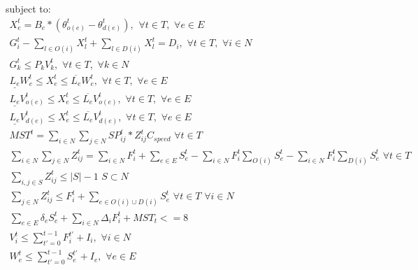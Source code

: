 \documentclass[10pt]{article}
\begin{document}
subject to:
\begin{eqnarray}
 X_e^t = B_e * (\theta_{o(e)}^t - \theta_{d(e)}^t), \hspace{5pt} \forall t \in T, \hspace{4pt} \forall e \in E\\
 G_i^t - \sum_{l \in O(i)} X_l^t + \sum_{l \in D(i)} X_l^t = D_i, \hspace{4pt} \forall t \in T, \hspace{4pt} \forall i \in N\\
 G_k^t \leq P_{k} V_{k}^t, \hspace{4pt} \forall t \in T, \hspace{4pt} \forall k \in N\\
 \underline{L_e}W_{e}^t \leq X_{e}^t \leq \overline{L_e}W_{e}^t, \hspace{4pt} \forall t \in T, \hspace{4pt} \forall e \in E\\
 \underline{L_e}V_{o(e)}^t \leq X_{e}^t \leq \overline{L_e}V_{o(e)}^t, \hspace{4pt} \forall t \in T, \hspace{4pt} \forall e \in E\\
 \underline{L_e}V_{d(e)}^t \leq X_{e}^t \leq \overline{L_e}V_{d(e)}^t, \hspace{4pt} \forall t \in T, \hspace{4pt} \forall e \in E\\
 MST^t = \sum_{i \in N} \sum_{j \in N} SP_{ij}^t*Z_{ij}^{t} C_{speed}\hspace{4pt} \forall t \in T\\
 \sum_{i \in N} \sum_{j \in N} Z_{ij}^{t} = \sum_{i \in N} F_i^t + \sum_{e \in E} S_e^t - \sum_{i \in N} F_i^t \sum_{O(i)} S_e^t - \sum_{i \in N} F_i^t \sum_{D(i)} S_e^t \hspace{4pt} \forall t \in T\\
 \sum_{i,j \in S} Z_{ij}^t \leq |S|-1 \hspace{4pt} S\subset N\\
 \sum_{j \in N} Z_{ij}^t \leq F_i^t + \sum_{e \in O(i) \cup D(i)} S_{e}^t \hspace{4pt} \forall t \in T\hspace{4pt} \forall i \in N \\
 \sum_{e \in E} \delta_{e}S_e^t + \sum_{i \in N}\Delta_{i}F_i^t + MST_t <=8\\
 V_i^t \leq \sum_{t'=0}^{t-1} F_i^{t'}+I_i, \hspace{4pt} \forall i \in N\\
 W_{e}^t \leq \sum_{t'=0}^{t-1} S_{e}^{t'}+I_e, \hspace{4pt} \forall e \in E
 \end{eqnarray}
\end{document}
